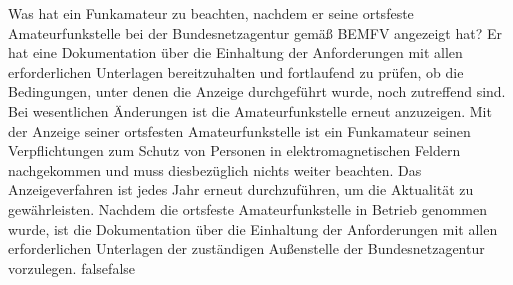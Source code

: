     {Was hat ein Funkamateur zu beachten, nachdem er seine ortsfeste Amateurfunkstelle bei der Bundesnetzagentur gemäß BEMFV angezeigt hat?}
    {Er hat eine Dokumentation über die Einhaltung der Anforderungen mit allen erforderlichen Unterlagen bereitzuhalten und fortlaufend zu prüfen, ob die Bedingungen, unter denen die Anzeige durchgeführt wurde, noch zutreffend sind. Bei wesentlichen Änderungen ist die Amateurfunkstelle erneut anzuzeigen.}
    {Mit der Anzeige seiner ortsfesten Amateurfunkstelle ist ein Funkamateur seinen Verpflichtungen zum Schutz von Personen in elektromagnetischen Feldern nachgekommen und muss diesbezüglich nichts weiter beachten.}
    {Das Anzeigeverfahren ist jedes Jahr erneut durchzuführen, um die Aktualität zu gewährleisten.}
    {Nachdem die ortsfeste Amateurfunkstelle in Betrieb genommen wurde, ist die Dokumentation über die Einhaltung der Anforderungen mit allen erforderlichen Unterlagen der zuständigen Außenstelle der Bundesnetzagentur vorzulegen.}
    {false}{false}